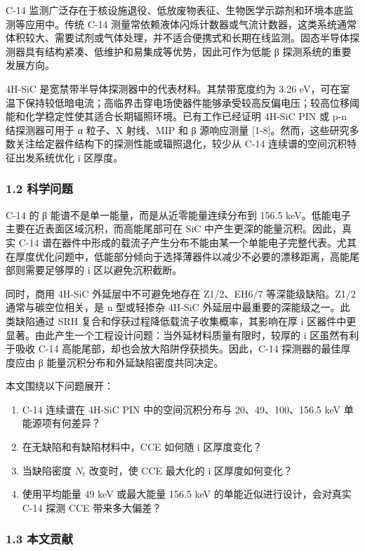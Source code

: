 \documentclass[
  10pt,
  a4paper,
]{ctexart}
\providecommand{\tightlist}{%
  \setlength{\itemsep}{0pt}\setlength{\parskip}{0pt}}
\begin{document}
C-14
监测广泛存在于核设施退役、低放废物表征、生物医学示踪剂和环境本底监测等应用中。传统
C-14
测量常依赖液体闪烁计数器或气流计数器，这类系统通常体积较大、需要试剂或气体处理，并不适合便携式和长期在线监测。固态半导体探测器具有结构紧凑、低维护和易集成等优势，因此可作为低能
β 探测系统的重要发展方向。

4H-SiC 是宽禁带半导体探测器中的代表材料。其禁带宽度约为 3.26
eV，可在室温下保持较低暗电流；高临界击穿电场使器件能够承受较高反偏电压；较高位移阈能和化学稳定性使其适合长期辐照环境。已有工作已经证明
4H-SiC PIN 或 p-n 结探测器可用于 α 粒子、X 射线、MIP 和 β 源响应测量
{[}1-8{]}。然而，这些研究多数关注给定器件结构下的探测性能或辐照退化，较少从
C-14 连续谱的空间沉积特征出发系统优化 i 区厚度。

\subsubsection{1.2 科学问题}\label{ux79d1ux5b66ux95eeux9898}

C-14 的 β 能谱不是单一能量，而是从近零能量连续分布到 156.5
keV。低能电子主要在近表面区域沉积，而高能尾部可在 SiC
中产生更深的能量沉积。因此，真实 C-14
谱在器件中形成的载流子产生分布不能由某一个单能电子完整代表。尤其在厚度优化问题中，低能部分倾向于选择薄器件以减少不必要的漂移距离，高能尾部则需要足够厚的
i 区以避免沉积截断。

同时，商用 4H-SiC 外延层中不可避免地存在 Z1/2、EH6/7 等深能级缺陷。Z1/2
通常与碳空位相关，是 n 型或轻掺杂 4H-SiC
外延层中最重要的深能级之一。此类缺陷通过 SRH
复合和俘获过程降低载流子收集概率，其影响在厚 i
区器件中更显著。由此产生一个工程设计问题：当外延材料质量有限时，较厚的 i
区虽然有利于吸收 C-14 高能尾部，却也会放大陷阱俘获损失。因此，C-14
探测器的最佳厚度应由 β 能量沉积分布和外延缺陷密度共同决定。

本文围绕以下问题展开：

\begin{enumerate}
\def\labelenumi{\arabic{enumi}.}
\tightlist
\item
  C-14 连续谱在 4H-SiC PIN 中的空间沉积分布与 20、49、100、156.5 keV
  单能源项有何差异？
\item
  在无缺陷和有缺陷材料中，CCE 如何随 i 区厚度变化？
\item
  当缺陷密度 \(N_t\) 改变时，使 CCE 最大化的 i 区厚度如何变化？
\item
  使用平均能量 49 keV 或最大能量 156.5 keV 的单能近似进行设计，会对真实
  C-14 探测 CCE 带来多大偏差？
\end{enumerate}

\subsubsection{1.3 本文贡献}\label{ux672cux6587ux8d21ux732e}
\end{document}
